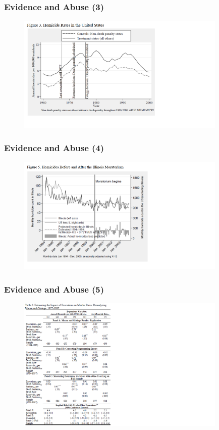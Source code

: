\documentclass{beamer}
\newcommand{\1}{\mathbb{1}}
\begin{document}
\begin{frame}\frametitle{Evidence and Abuse (3)}
\begin{figure}
\includegraphics[width = 10cm]{plot/Nondeath}
\end{figure}
\end{frame}

\begin{frame}\frametitle{Evidence and Abuse (4)}
\begin{figure}
\includegraphics[width = 10cm]{plot/Illinois}
\end{figure}
\end{frame}

\begin{frame}\frametitle{Evidence and Abuse (5)}
\begin{figure}
\includegraphics[width = 10cm]{plot/Table}
\end{figure}
\end{frame}
\end{document}
